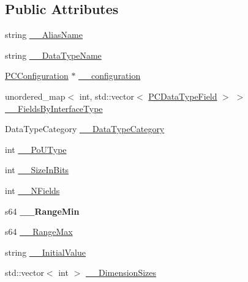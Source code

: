 \subsection*{Public Attributes}
\begin{DoxyCompactItemize}
\item 
string \hyperlink{classpc__emulator_1_1PCDataType_a1d2bc1d0a8d4e10187329ec3aa9ecdce}{\+\_\+\+\_\+\+Alias\+Name}
\item 
string \hyperlink{classpc__emulator_1_1PCDataType_a2e2d09be945e543baec1ce4f5dbdb305}{\+\_\+\+\_\+\+Data\+Type\+Name}
\item 
\hyperlink{classpc__emulator_1_1PCConfiguration}{P\+C\+Configuration} $\ast$ \hyperlink{classpc__emulator_1_1PCDataType_ae1d09cd2a600dea4b584dd428140df49}{\+\_\+\+\_\+configuration}
\item 
unordered\+\_\+map$<$ int, std\+::vector$<$ \hyperlink{classpc__emulator_1_1PCDataTypeField}{P\+C\+Data\+Type\+Field} $>$ $>$ \hyperlink{classpc__emulator_1_1PCDataType_a947202be852f43c02ef7bd6a6cc73bcc}{\+\_\+\+\_\+\+Fields\+By\+Interface\+Type}
\item 
Data\+Type\+Category \hyperlink{classpc__emulator_1_1PCDataType_acd8e485e5e6c2cdddab8efd8bcbabfe3}{\+\_\+\+\_\+\+Data\+Type\+Category}
\item 
int \hyperlink{classpc__emulator_1_1PCDataType_ac2d244cddd2a30b343aae3af6f291736}{\+\_\+\+\_\+\+Po\+U\+Type}
\item 
int \hyperlink{classpc__emulator_1_1PCDataType_a7556d336d3903549f2be43aa5d28763d}{\+\_\+\+\_\+\+Size\+In\+Bits}
\item 
int \hyperlink{classpc__emulator_1_1PCDataType_a11e95666790ef978dbca91e99649acd1}{\+\_\+\+\_\+\+N\+Fields}
\item 
s64 {\bfseries \+\_\+\+\_\+\+Range\+Min}\hypertarget{classpc__emulator_1_1PCDataType_a29718c3e1d72d9fefe945a62ea74171a}{}\label{classpc__emulator_1_1PCDataType_a29718c3e1d72d9fefe945a62ea74171a}

\item 
s64 \hyperlink{classpc__emulator_1_1PCDataType_a8b4ce729396059f7fe634a5f35f9a2ca}{\+\_\+\+\_\+\+Range\+Max}
\item 
string \hyperlink{classpc__emulator_1_1PCDataType_aff22e942df6ba861085f1d2e7a0cf91a}{\+\_\+\+\_\+\+Initial\+Value}
\item 
std\+::vector$<$ int $>$ \hyperlink{classpc__emulator_1_1PCDataType_a325bb0ecb84506cf78ef1a53cdbe2945}{\+\_\+\+\_\+\+Dimension\+Sizes}
\end{DoxyCompactItemize}


